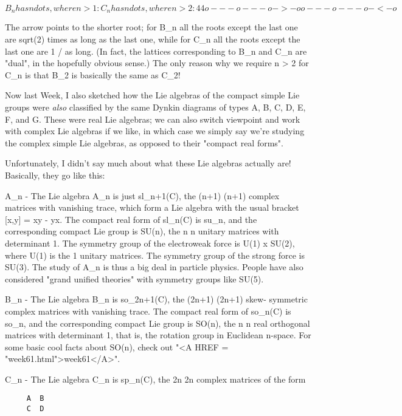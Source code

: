 $$
B_{n} has n dots, where n > 1:       C_{n} has n dots, where n > 2:

          4                                  4
o---o---o->-o                      o---o---o-<-o
$$
    

The arrow points to the shorter root; for B_{n} all the roots
except the last one are sqrt(2) times as long as the last one, while
for C_{n} all the roots except the last one are 1 /  as
long.  (In fact, the lattices corresponding to B_{n} and
C_{n} are "dual", in the hopefully obvious sense.)  The only
reason why we require n > 2 for C_{n} is that B_{2} is
basically the same as C_{2}!

Now last Week, I also sketched how the Lie algebras of the compact
simple Lie groups were \emph{also} classified by the same Dynkin diagrams
of types A, B, C, D, E, F, and G.  These were real Lie algebras; we
can also switch viewpoint and work with complex Lie algebras if we
like, in which case we simply say we're studying the complex simple
Lie algebras, as opposed to their "compact real forms".

Unfortunately, I didn't say much about what these Lie algebras actually
are!  Basically, they go like this:

A_{n} - The Lie algebra A_{n} is just sl_{n+1}(C),
the (n+1) \times  (n+1) complex matrices with vanishing trace, which form a
Lie algebra with the usual bracket [x,y] = xy - yx.  The compact real
form of sl_{n}(C) is su_{n}, and the corresponding
compact Lie group is SU(n), the n \times  n unitary matrices with
determinant 1.  The symmetry group of the electroweak force is U(1) x
SU(2), where U(1) is the 1  unitary matrices.  The symmetry group
of the strong force is SU(3).  The study of A_{n} is thus a
big deal in particle physics.  People have also considered "grand
unified theories" with symmetry groups like SU(5).

B_{n} - The Lie algebra B_{n} is
so_{2n+1}(C), the (2n+1) \times  (2n+1) skew- symmetric complex
matrices with vanishing trace.  The compact real form of
so_{n}(C) is so_{n}, and the corresponding compact Lie
group is SO(n), the n \times  n real orthogonal matrices with determinant 1,
that is, the rotation group in Euclidean n-space.  For some basic cool
facts about SO(n), check out "<A HREF = "week61.html">week61</A>".

C_{n} - The Lie algebra C_{n} is sp_{n}(C),
the 2n \times  2n complex matrices of the form

\begin{verbatim}
     A  B
     C  D
\end{verbatim}
    

